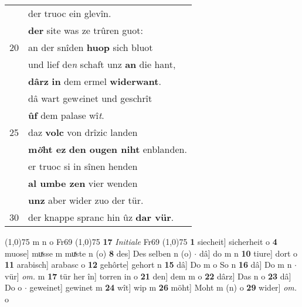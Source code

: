 \documentclass[8pt,a4paper,notitlepage]{article}
\begin{document}
\begin{table}[ht]
\begin{minipage}[t]{0.5\linewidth}
\begin{tabular}{rl}
 & der truoc ein glevîn.\\ 
 & \textbf{der} site was ze trûren guot:\\ 
20 & an der snîden \textbf{huop} sich bluot\\ 
 & und lief de\textit{n} schaft unz \textbf{an} die hant,\\ 
 & \textbf{dârz} \textbf{in} dem ermel \textbf{widerwant}.\\ 
 & dâ wart gew\textit{e}inet und geschrît\\ 
 & \textbf{ûf} dem palase wî\textit{t}.\\ 
25 & daz \textbf{volc} von drîzic landen\\ 
 & \textbf{m\textit{ö}ht ez} \textbf{den ougen niht} enblanden.\\ 
 & er truoc si in sînen henden\\ 
 & \textbf{al umbe zen} vier wenden\\ 
 & \textbf{unz} aber wider zuo der tür.\\ 
30 & der knappe spranc hin ûz \textbf{dar vür}.\\ 
\end{tabular}
\scriptsize
\line(1,0){75} \newline
m n o Fr69 \newline
\line(1,0){75} \newline
\textbf{17} \textit{Initiale} Fr69  \newline
\line(1,0){75} \newline
\textbf{1} siecheit] sicherheit o \textbf{4} muose] muͯsse m muͯste n (o) \textbf{8} des] Des selben n (o)  $\cdot$ dâ] do m n \textbf{10} tiure] dort o \textbf{11} arabisch] arabasc o \textbf{12} gehôrte] gehort n \textbf{15} dâ] Do m o So n \textbf{16} dâ] Do m n  $\cdot$ vür] \textit{om.} m \textbf{17} tür her în] torren in o \textbf{21} den] dem m o \textbf{22} dârz] Das n o \textbf{23} dâ] Do o  $\cdot$ geweinet] gewinet m \textbf{24} wît] wip m \textbf{26} möht] Moht m (n) o \textbf{29} wider] \textit{om.} o \newline
\end{minipage}
\end{table}
\newpage
\end{document}

